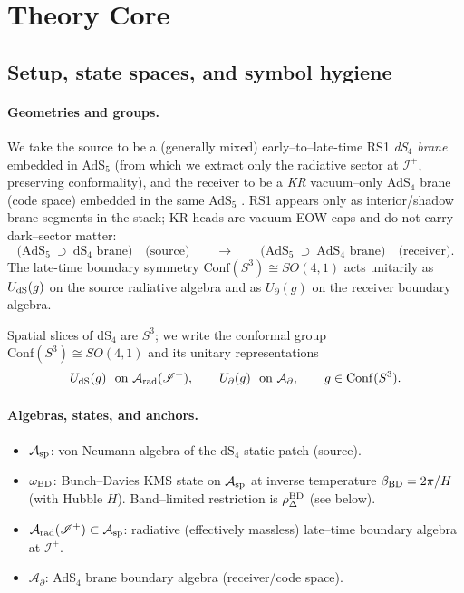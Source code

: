 \documentclass[10pt]{article}
\theoremstyle{definition}
\theoremstyle{plain}
\begin{document}
\section{Theory Core}\label{sec:uom-main-002}

\subsection{Setup, state spaces, and symbol hygiene}
\label{subsec:scene-notation}

\paragraph{Geometries and groups.}\label{par:uom-main-003}
We take the source to be a (generally mixed) early--to--late-time RS1 \cite{RandallSundrum1999RS1,RandallSundrum1999RS2}
\emph{dS$_4$ brane} embedded in AdS$_5$
(from which we extract only the radiative sector at $\mathscr I^+$, preserving conformality), and the
receiver to be a \emph{KR} vacuum--only AdS$_4$ brane (code space) embedded in the same AdS$_5$ \cite{KarchRandall2001}.
RS1 appears only as interior/shadow brane segments in the stack; KR heads are vacuum EOW caps and do not
carry dark--sector matter:
\[
\big(\mathrm{AdS}_5\ \supset\ \mathrm{dS}_4\text{ brane}\big)\quad\text{(source)}
\qquad\longrightarrow\qquad
\big(\mathrm{AdS}_5\ \supset\ \mathrm{AdS}_4\text{ brane}\big)\quad\text{(receiver)}.
\]
The late-time boundary symmetry $\mathrm{Conf}(S^3)\cong SO(4,1)$ acts unitarily as
$U_{\rm dS}(g)$ on the source radiative algebra and as $U_\partial(g)$ on the receiver boundary algebra.

Spatial slices of $\mathrm{dS}_4$ are $S^3$; we write the conformal group
$\mathrm{Conf}(S^3)\cong SO(4,1)$ and its unitary representations
\[
U_{\rm dS}(g)\ \text{ on } \mathcal A_{\rm rad}(\mathscr I^+),\qquad
U_\partial(g)\ \text{ on } \mathcal A_\partial,\qquad g\in \mathrm{Conf}(S^3).
\]

\paragraph{Algebras, states, and anchors.}\label{par:uom-main-004}
\begin{itemize}[leftmargin=1.5em, itemsep=1pt]
\item $\mathcal A_{\rm sp}$: von Neumann algebra of the $\mathrm{dS}_4$ static patch (source).
\item $\omega_{\rm BD}$: Bunch–Davies KMS state on $\mathcal A_{\rm sp}$ at inverse temperature
$\beta_{\rm BD}=2\pi/H$ (with Hubble $H$). Band–limited restriction is $\rho^{\rm BD}_\Delta$ (see below).
\item $\mathcal A_{\rm rad}(\mathscr I^+)\subset \mathcal A_{\rm sp}$: radiative (effectively massless) late–time boundary algebra at $\mathscr I^+$.
\item $\mathcal A_\partial$: AdS$_4$ brane boundary algebra (receiver/code space).
\end{itemize}
\end{document}
